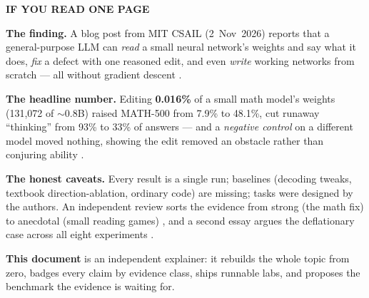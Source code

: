 \documentclass[11pt,a4paper]{article}
\begin{document}
{\hypersetup{linkcolor=inkink}\tableofcontents}
\newpage

\begin{onepage}
{\color{wspviolet}\bfseries IF YOU READ ONE PAGE}\par\vspace{3pt}
\textbf{The finding.} A blog post from MIT CSAIL (2~Nov~2026) reports that a general-purpose LLM can \emph{read} a small neural network's weights and say what it does, \emph{fix} a defect with one reasoned edit, and even \emph{write} working networks from scratch --- all without gradient descent \cite{wsp-post}.

\textbf{The headline number.} Editing \textbf{0.016\%} of a small math model's weights (131{,}072 of ${\sim}0.8$B) raised MATH-500 from 7.9\% to 48.1\%, cut runaway ``thinking'' from 93\% to 33\% of answers --- and a \emph{negative control} on a different model moved nothing, showing the edit removed an obstacle rather than conjuring ability \cite{wsp-post}.

\textbf{The honest caveats.} Every result is a single run; baselines (decoding tweaks, textbook direction-ablation, ordinary code) are missing; tasks were designed by the authors. An independent review sorts the evidence from strong (the math fix) to anecdotal (small reading games) \cite{maier}, and a second essay argues the deflationary case across all eight experiments \cite{goedecke}.

\textbf{This document} is an independent explainer: it rebuilds the whole topic from zero, badges every claim by evidence class, ships runnable labs, and proposes the benchmark the evidence is waiting for.
\end{onepage}

\vspace{0.8em}
\begin{abstract}
\noindent Weight-Space Programming (WSP) is the claim that a general-purpose large language model can read a neural network's parameters, diagnose them, and modify them --- or synthesise them from scratch --- through reasoning alone, optionally verified by a handful of forward passes. This whitepaper is an independent educational treatment of the finding, built around a strict evidential discipline: every figure, number, and claim carries exactly one of four badges (paper-reported, independent review, teaching schematic, speculation). We condense the original post's eight experiments, reconstruct their mechanisms with worked mathematics and three runnable labs, weigh them against the two published third-party assessments, and map both the authors' five predictions and a fuller horizon of futures and risks. We contribute WSP-Bench-Lite, a community benchmark proposal (Read/Fix/Write tracks, author-blind tasks, mandatory baselines, $\geq$5 seeds, drift and sparsity metrics) designed to close the specific evidential gaps the independent reviews identified. The reader journey runs from ``what is a weight?'' to ``how would I design the next experiment?''
\end{abstract}
\end{document}
